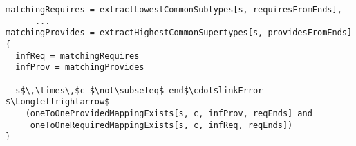 \lstset{frame=tb, aboveskip=12pt, belowskip=-3pt, breaklines=true, basicstyle=\small\ttfamily, tabsize=2, mathescape=true}
\begin{lstlisting}[caption={port\_inference.als, lines 86-111}, label=alloy:port_inference, captionpos=b]
matchingRequires = extractLowestCommonSubtypes[s, requiresFromEnds],
      ...
matchingProvides = extractHighestCommonSupertypes[s, providesFromEnds]
{
  infReq = matchingRequires
  infProv = matchingProvides

  s$\,\times\,$c $\not\subseteq$ end$\cdot$linkError $\Longleftrightarrow$
    (oneToOneProvidedMappingExists[s, c, infProv, reqEnds] and
     oneToOneRequiredMappingExists[s, c, infReq, reqEnds])
}
\end{lstlisting}